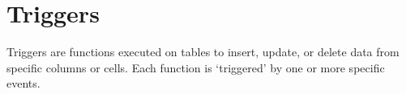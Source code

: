 \section{Triggers}\label{sec_triggers}

Triggers are functions executed on tables to insert, update, or delete data from specific columns or cells. Each function is `triggered' by one or more specific events.

		
		

		
		
		